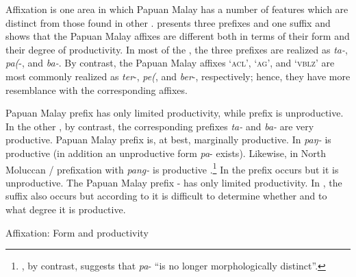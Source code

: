 {Affixation is one area in which Papuan Malay has a number of features which are distinct from those found in other .  presents three prefixes and one suffix and shows that the Papuan Malay affixes are different both in terms of their form and their degree of productivity. In most of the , the three prefixes are realized as \textit{ta-}, \textit{pa(}\textitbf{)}-, and \textit{ba-}. By contrast, the Papuan Malay affixes  ‘\textsc{acl}’,  ‘\textsc{ag}’, and  ‘\textsc{vblz}’ are most commonly realized as \textit{ter}-, \textit{pe(}\textitbf{)}\textitbf{-}, and \textit{ber}-, respectively; hence, they have more resemblance with the corresponding  affixes.



Papuan Malay prefix  has only limited productivity, while prefix  is unproductive. In the other , by contrast, the corresponding prefixes \textit{ta-} and \textit{ba-} are very productive. Papuan Malay prefix  is, at best, marginally productive. In  \textit{paŋ-} is productive (in addition an unproductive form \textit{pa}\textsc{-} exists). Likewise, in North Moluccan /  prefixation with \textit{pang-} is productive \citep[30]{Litamahuputty.2012}.\footnote{\citet[4]{Voorhoeve.1983}, by contrast, suggests that \textit{pa}-  ``is no longer morphologically distinct''.} In  the prefix occurs but it is unproductive. The Papuan Malay prefix - has only limited productivity. In , the suffix also occurs but according to \citet[106]{vanMinde.1997} it is difficult to determine whether and to what degree it is productive.


\begin{table}
\caption{Affixation: Form and productivity}\label{Table_1.7}


\end{table}}
